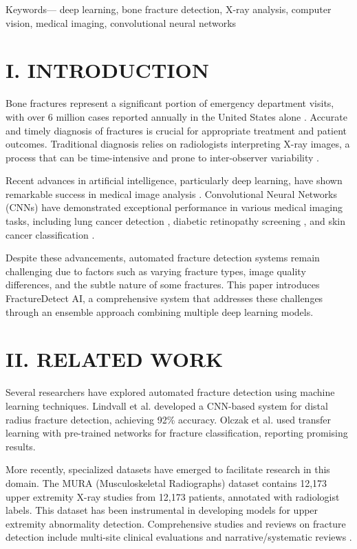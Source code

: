 \documentclass[conference]{IEEEtran}
\begin{document}
\noindent Keywords— deep learning, bone fracture detection, X-ray analysis, computer vision, medical imaging, convolutional neural networks


\section{I. INTRODUCTION}
\label{sec:introduction}

Bone fractures represent a significant portion of emergency department visits, with over 6 million cases reported annually in the United States alone \cite{robbins2019epidemiology}. Accurate and timely diagnosis of fractures is crucial for appropriate treatment and patient outcomes. Traditional diagnosis relies on radiologists interpreting X-ray images, a process that can be time-intensive and prone to inter-observer variability \cite{berlin1993variability}.

Recent advances in artificial intelligence, particularly deep learning, have shown remarkable success in medical image analysis \cite{litjens2017survey}. Convolutional Neural Networks (CNNs) have demonstrated exceptional performance in various medical imaging tasks, including lung cancer detection \cite{ardila2019population}, diabetic retinopathy screening \cite{gulshan2016development}, and skin cancer classification \cite{esteva2017dermatologist}.

Despite these advancements, automated fracture detection systems remain challenging due to factors such as varying fracture types, image quality differences, and the subtle nature of some fractures. This paper introduces FractureDetect AI, a comprehensive system that addresses these challenges through an ensemble approach combining multiple deep learning models.

\section{II. RELATED WORK}
\label{sec:related_work}

Several researchers have explored automated fracture detection using machine learning techniques. Lindvall et al. \cite{lindvall2018deep} developed a CNN-based system for distal radius fracture detection, achieving 92\% accuracy. Olczak et al. \cite{olczak2017machine} used transfer learning with pre-trained networks for fracture classification, reporting promising results.

More recently, specialized datasets have emerged to facilitate research in this domain. The MURA (Musculoskeletal Radiographs) dataset \cite{rajpurkar2017mura} contains 12,173 upper extremity X-ray studies from 12,173 patients, annotated with radiologist labels. This dataset has been instrumental in developing models for upper extremity abnormality detection. Comprehensive studies and reviews on fracture detection include multi-site clinical evaluations and narrative/systematic reviews \cite{jones2020npj,kalmet2020acta,su2023diagnostics,thian2019rai,hardalac2022sensors,tahir2024ensemble,anderson2022wrist,nowroozi2024meta}.
\end{document}
